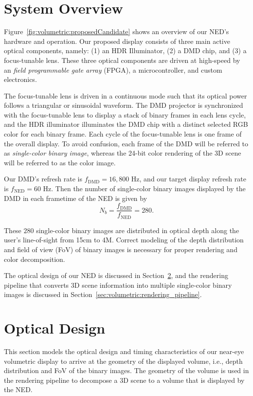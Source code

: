 \section{System Overview}
\label{sec:volumetric:system_overview}
Figure~\ref{fig:volumetric:proposedCandidate} shows an overview of our NED's hardware and operation. Our proposed display consists of three main active optical components, namely: (1) an HDR Illuminator, (2) a DMD chip, and (3) a focus-tunable lens. These three optical components are driven at high-speed by an \emph{field programmable gate array} (FPGA), a microcontroller, and custom electronics. 


The focus-tunable lens is driven in a continuous mode such that its optical power follows a triangular or sinusoidal waveform. The DMD projector is synchronized with the focus-tunable lens to display a stack of binary frames in each lens cycle, and the HDR illuminator illuminates the DMD chip with a distinct selected RGB color for each binary frame. Each cycle of the focus-tunable lens is one frame of the overall display. To avoid confusion, each frame of the DMD will be referred to as \emph{single-color binary image}, whereas the 24-bit color rendering of the 3D scene will be referred to as the color image.

Our DMD's refresh rate is $f_{\text{DMD}} = 16,800$ Hz, and our target display refresh rate is $f_{\text{NED}}=60$ Hz. Then the number of single-color binary images displayed by the DMD in each frametime of the NED is given by
\begin{equation}
N_b = \frac{f_{\text{DMD}}}{f_{\text{NED}}} = 280.
\label{eq:280}
\end{equation}

These $280$ single-color binary images are distributed in optical depth along the user's line-of-sight from 15cm to 4M.  Correct modeling of the depth distribution and field of view (FoV) of binary images is necessary for proper rendering and color decomposition. 

The optical design of our NED is discussed in Section~\ref{sec:volumetric:Optical_design}, and the rendering pipeline that converts 3D scene information into multiple single-color binary images is discussed in Section~\ref{sec:volumetric:rendering_pipeline}. 


\section{Optical Design}
\label{sec:volumetric:Optical_design}
This section models the optical design and timing characteristics of our near-eye volumetric display to arrive at the geometry of the displayed volume, i.e., depth distribution and FoV of the binary images. The geometry of the volume is used in the rendering pipeline to decompose a 3D scene to a volume that is displayed by the NED.

